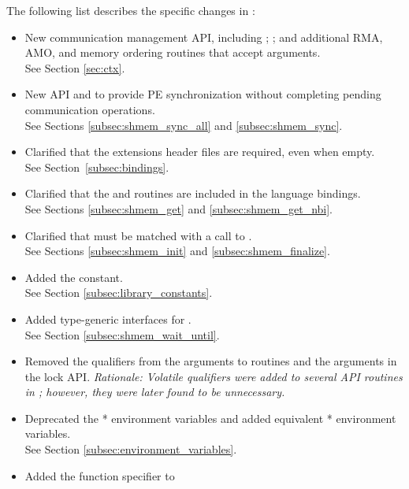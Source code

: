 The following list describes the specific changes in \openshmem[1.4]:
\begin{itemize}
%
\item New communication management API, including ;
    ; and additional RMA, AMO, and memory ordering
    routines that accept  arguments.
\\See Section \ref{sec:ctx}.
%
\item New API  and  to provide \ac{PE}
    synchronization without completing pending communication operations.
    \\See Sections \ref{subsec:shmem_sync_all} and \ref{subsec:shmem_sync}.
%
\item Clarified that the \openshmem extensions header files are required, even when empty.
\\See Section~\ref{subsec:bindings}.
%
\item Clarified that the  and 
    routines are included in the \Fortran language bindings.\\
    See Sections \ref{subsec:shmem_get} and \ref{subsec:shmem_get_nbi}.
%
\item Clarified that  must be matched with a call to
    .
\\See Sections \ref{subsec:shmem_init} and \ref{subsec:shmem_finalize}.
%
\item Added the  constant.
\\See Section \ref{subsec:library_constants}.
%
\item Added type-generic interfaces for .
\\ See Section \ref{subsec:shmem_wait_until}.
%
\item Removed the  qualifiers from the  arguments to
 routines and the  arguments in the lock API.
\emph{Rationale: Volatile qualifiers were added to several API routines in
\openshmem[1.3]; however, they were later found to be unnecessary.}
%
%
\item Deprecated the * environment variables and added equivalent
* environment variables.
\\ See Section \ref{subsec:environment_variables}.
%
\item Added the \Cstd[11]  function specifier to

\end{itemize}
